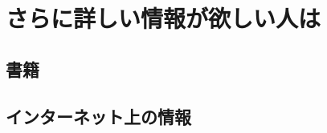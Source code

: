 \chapter{さらに詳しい情報が欲しい人は}
\label{ch:information}


\section{書籍}
\label{sec:book}

\section{インターネット上の情報}
\label{sec:internet}



